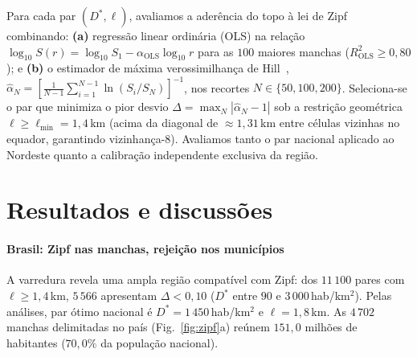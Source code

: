 \documentclass[10pt,a4paper,twocolumn]{article}
\begin{document}
Para cada par $(D^{*},\ell)$, avaliamos a aderência do topo à lei de Zipf combinando: \textbf{(a)} regressão linear ordinária (OLS) na relação $\log_{10} S(r) = \log_{10} S_1 - \alpha_{\mathrm{OLS}}\log_{10} r$ para as $100$ maiores manchas ($R^{2}_{\mathrm{OLS}} \geq 0{,}80$); e \textbf{(b)} o estimador de máxima verossimilhança de Hill~\cite{hill1975}, $\hat{\alpha}_N = [\frac{1}{N-1}\sum_{i=1}^{N-1}\ln(S_i/S_N)]^{-1}$, nos recortes $N\in\{50, 100, 200\}$. Seleciona-se o par que minimiza o pior desvio $\Delta = \max_{N} |\hat{\alpha}_N - 1|$ sob a restrição geométrica $\ell \geq \ell_{\min} = 1{,}4$\,km (acima da diagonal de $\approx 1{,}31$\,km entre células vizinhas no equador, garantindo vizinhança-8). Avaliamos tanto o par nacional aplicado ao Nordeste quanto a calibração independente exclusiva da região.


\section{Resultados e discussões}

\paragraph{Brasil: Zipf nas manchas, rejeição nos municípios}
A varredura revela uma ampla região compatível com Zipf: dos $11\,100$ pares com $\ell \geq 1{,}4$\,km, $5\,566$ apresentam $\Delta < 0{,}10$ ($D^{*}$ entre $90$ e $3\,000$\,hab/km$^{2}$). Pelas análises, par ótimo nacional é $D^{*} = 1\,450$\,hab/km$^{2}$ e $\ell = 1{,}8$\,km. As $4\,702$ manchas delimitadas no país (Fig.~\ref{fig:zipf}a) reúnem $151{,}0$ milhões de habitantes ($70{,}0\%$ da população nacional).
\end{document}

